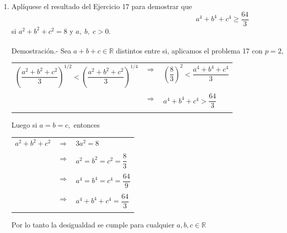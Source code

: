 \begin{enumerate}[ \bfseries 1.]
\item Aplíquese	el resultado del Ejercicio 17 para demostrar que
$$a^4 + b^4 + c^4 \geq \dfrac{64}{3}$$ si $a^2 + b^2 +c^2 = 8$ y $a, \; b, \;c>0.$\\\\
Demostración.- \; Sea $a + b + c \in \mathbb{R}$ distintos entre si, aplicamos el problema 17 con $p=2$, 
\begin{center}
\begin{tabular}{rcl}
$\left( \dfrac{a^2 + b^2 + c^2}{3} \right)^{1/2}< \left( \dfrac{a^2 + b^2 + c^2}{3} \right)^{1/4}$&$\Rightarrow$&$\left(\dfrac{8}{3}\right)^2 < \dfrac{a^4 + b^4 + c^4}{3}$\\\\
&$\Rightarrow$&$a^4+b^4+c^4 > \dfrac{64}{3}$\\\\
\end{tabular}
\end{center} 
Luego si $a=b=c,$ entonces 
\begin{center}
\begin{tabular}{rcl}
$a^2+b^2+c^2$&$\Rightarrow$&$3a^2=8$\\\\
&$\Rightarrow$&$a^2=b^2=c^2=\dfrac{8}{3}$\\\\
&$\Rightarrow$&$a^4=b^4=c^4 = \dfrac{64}{9}$\\\\
&$\Rightarrow$&$a^4+b^4+c^4 = \dfrac{64}{3}$\\\\
\end{tabular}
\end{center}
Por lo tanto la desigualdad se cumple para cualquier $a,b,c \in \mathbb{R}$\\\\


\end{enumerate}
